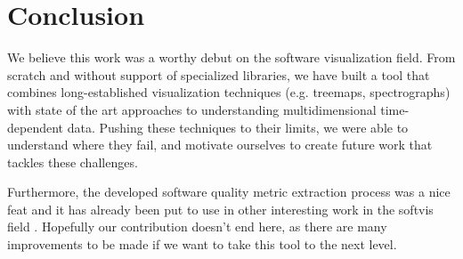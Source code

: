 \chapter{Conclusion} \label{sec:conclusion}
We believe this work was a worthy debut on the software visualization field. From scratch and without support of specialized libraries, we have built a tool that combines long-established visualization techniques (e.g. treemaps, spectrographs) with state of the art approaches to understanding multidimensional time-dependent data. Pushing these techniques to their limits, we were able to understand where they fail, and motivate ourselves to create future work that tackles these challenges.

Furthermore, the developed software quality metric extraction process was a nice feat and it has already been put to use in other interesting work in the softvis field \cite{ref:silva2}. Hopefully our contribution doesn't end here, as there are many improvements to be made if we want to take this tool to the next level.
